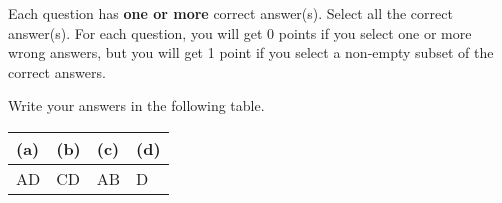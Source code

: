
Each question has \textbf{one or more} correct answer(s). Select all the correct answer(s). For each question, you will get 0 points if you select one or more wrong answers, but you will get 1 point if you select a non-empty subset of the correct answers.

Write your answers in the following table.


\begin{table}[htbp]
	\centering
	\begin{tabular}{|p{2cm}|p{2cm}|p{2cm}|p{2cm}|}
		\hline 
		(a) & (b) & (c) & (d) \\
		\hline
		AD & CD & AB & D\\
		\hline
	\end{tabular} 
\end{table}

